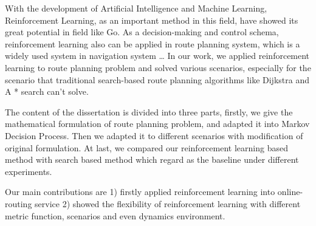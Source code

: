 \documentclass{standalone}
\begin{document}
\begin{englishabstract}
    With the development of Artificial Intelligence and Machine Learning, Reinforcement Learning, as an important method in this field, have showed its great potential in field like Go. As a decision-making and control schema, reinforcement learning also can be applied in route planning system, which is a widely used system in navigation system … In our work, we applied reinforcement learning to route planning problem and solved various scenarios, especially for the scenario that traditional search-based route planning algorithms like Dijkstra and A * search can’t solve. 
    
    The content of the dissertation is divided into three parts, firstly, we give the mathematical formulation of route planning problem, and adapted it into Markov Decision Process. Then we adapted it to different scenarios with modification of original formulation. At last, we compared our reinforcement learning based method with search based method which regard as the baseline under different experiments.
    
    Our main contributions are 1) firstly applied reinforcement learning into online-routing service 2) showed the flexibility of reinforcement learning with different metric function, scenarios and even dynamics environment.

	
\end{englishabstract}
\end{document}
